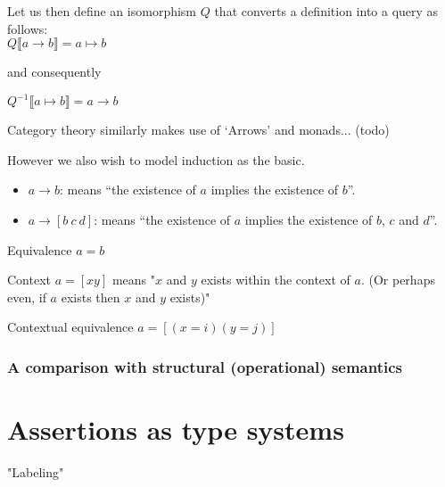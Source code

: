 \documentclass[11pt]{article}
\begin{document}
Let us then define an isomorphism $Q$ that converts a definition into a query as follows:\\

$Q\llbracket a \rightarrow b \rrbracket = a \mapsto b$

and consequently

$Q^{-1}\llbracket a \mapsto b\rrbracket = a \rightarrow b$


Category theory similarly makes use of `Arrows' and monads... (todo)


However we also wish to model induction as the basic.

\begin{itemize}
\item $a \rightarrow b$: means ``the existence of $a$ implies the existence of $b$''.
\item $a \rightarrow [b\ c\ d]$: means ``the existence of $a$ implies the existence of $b$, $c$ and $d$''.
\end{itemize}

Equivalence
$a = b$

Context
$a = [x y]$ means "$x$ and $y$ exists within the context of $a$. (Or perhaps even, if $a$ exists then $x$ and $y$ exists)"

Contextual equivalence
$a = [(x = i) (y = j)]$

\subsubsection{ A comparison with structural (operational) semantics }













\section*{Assertions as type systems}
"Labeling"
\end{document}
